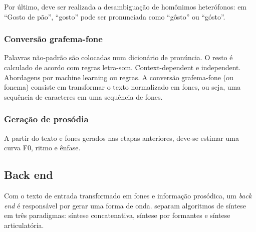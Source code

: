 Por último, deve ser realizada a desambiguação de homônimos heterófonos: em
``Gosto de pão'', ``gosto'' pode ser pronunciada como ``gôsto'' ou ``gósto''.

\subsubsection{Conversão grafema-fone}
Palavras não-padrão são colocadas num dicionário de pronúncia. O resto é
calculado de acordo com regras letra-som.
Context-dependent e independent. Abordagens por machine learning ou regras.
A conversão grafema-fone (ou fonema) consiste em transformar o texto normalizado
em fones, ou seja, uma sequência de caracteres em uma sequência de fones.

\subsubsection{Geração de prosódia}
A partir do texto e fones gerados nas etapas anteriores, deve-se estimar uma
curva F0, ritmo e ênfase.



\subsection{Back end}
Com o texto de entrada transformado em fones e informação prosódica, um
\emph{back end} é responsável por gerar uma forma de onda.
 separam algoritmos de síntese em três paradigmas:
síntese concatenativa, síntese por formantes e síntese articulatória. 

